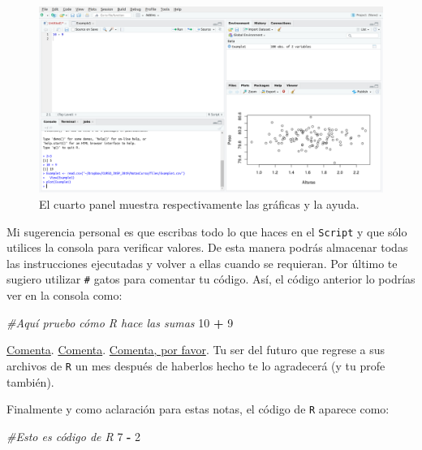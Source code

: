 \documentclass[
]{book}
\newenvironment{Shaded}{\begin{snugshade}}{\end{snugshade}}
\newcommand{\CommentTok}[1]{\textcolor[rgb]{0.56,0.35,0.01}{\textit{#1}}}
\newcommand{\DecValTok}[1]{\textcolor[rgb]{0.00,0.00,0.81}{#1}}
\newcommand{\OperatorTok}[1]{\textcolor[rgb]{0.81,0.36,0.00}{\textbf{#1}}}
\newcommand{\StringTok}[1]{\textcolor[rgb]{0.31,0.60,0.02}{#1}}
\begin{document}
\begin{figure}

{\centering \includegraphics[width=40in]{images/RStudio7} 

}

\caption{El cuarto panel muestra respectivamente las gráficas y la ayuda.}\label{fig:unnamed-chunk-33}
\end{figure}

Mi sugerencia personal es que escribas todo lo que haces en el \texttt{Script} y que sólo utilices la consola para verificar valores. De esta manera podrás almacenar todas las instrucciones ejecutadas y volver a ellas cuando se requieran. Por último te sugiero utilizar \texttt{\#} gatos para comentar tu código. Así, el código anterior lo podrías ver en la consola como:

\begin{Shaded}
\begin{Highlighting}[]
\CommentTok{#Aquí pruebo cómo R hace las sumas}
\DecValTok{10} \OperatorTok{+}\StringTok{ }\DecValTok{9}
\end{Highlighting}
\end{Shaded}

\href{https://www.freecodecamp.org/news/code-comments-the-good-the-bad-and-the-ugly-be9cc65fbf83/}{Comenta}. \href{https://www.c-sharpcorner.com/blogs/why-comments-are-important-while-writing-a-code}{Comenta}. \href{https://blog.codinghorror.com/code-tells-you-how-comments-tell-you-why/}{Comenta, por favor}. Tu ser del futuro que regrese a sus archivos de \texttt{R} un mes después de haberlos hecho te lo agradecerá (y tu profe también).

Finalmente y como aclaración para estas notas, el código de \texttt{R} aparece como:

\begin{Shaded}
\begin{Highlighting}[]
\CommentTok{#Esto es código de R}
\DecValTok{7} \OperatorTok{-}\StringTok{ }\DecValTok{2}
\end{Highlighting}
\end{Shaded}
\end{document}
